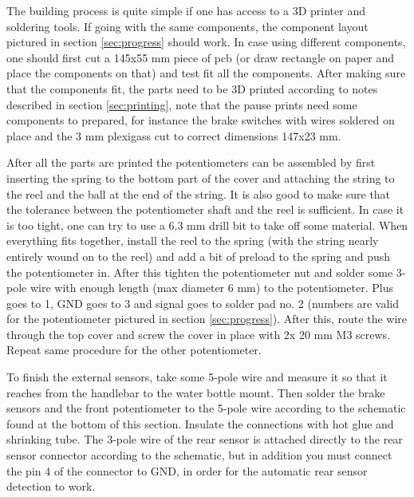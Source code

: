 \documentclass[a4paper,11pt]{article}
\begin{document}
The building process is quite simple if one has access to a 3D printer and soldering tools. If going with the same components, the component layout pictured in section \ref{sec:progress} should work. In case using different components, one should first cut a 145x55 mm piece of pcb (or draw rectangle on paper and place the components on that) and test fit all the components. After making sure that the components fit, the parts need to be 3D printed according to notes described in section \ref{sec:printing}, note that the pause prints need some components to prepared, for instance the brake switches with wires soldered on place and the 3 mm plexigass cut to correct dimensions 147x23 mm.

After all the parts are printed the potentiometers can be assembled by first inserting the spring to the bottom part of the cover and attaching the string to the reel and the ball at the end of the string. It is also good to make sure that the tolerance between the potentiometer shaft and the reel is sufficient. In case it is too tight, one can try to use a 6.3 mm drill bit to take off some material. When everything fits together, install the reel to the spring (with the string nearly entirely wound on to the reel) and add a bit of preload to the spring and push the potentiometer in. After this tighten the potentiometer nut and solder some 3-pole wire with enough length (max diameter 6 mm) to the potentiometer. Plus goes to 1, GND goes to 3 and signal goes to solder pad no. 2 (numbers are valid for the potentiometer pictured in section \ref{sec:progress}). After this, route the wire through the top cover and screw the cover in place with 2x 20 mm M3 screws. Repeat same procedure for the other potentiometer.

To finish the external sensors, take some 5-pole wire and measure it so that it reaches from the handlebar to the water bottle mount. Then solder the brake sensors and the front potentiometer to the 5-pole wire according to the schematic found at the bottom of this section. Insulate the connections with hot glue and shrinking tube. The 3-pole wire of the rear sensor is attached directly to the rear sensor connector according to the schematic, but in addition you must connect the pin 4 of the connector to GND, in order for the automatic rear sensor detection to work.
\end{document}
